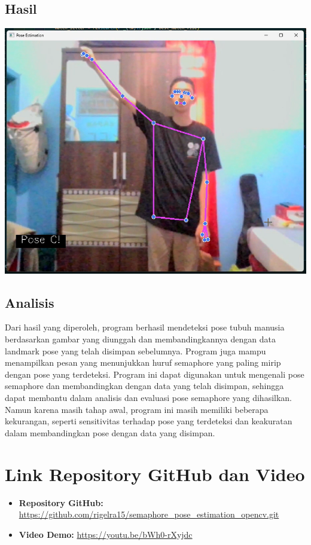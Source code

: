 \documentclass[a4paper,12pt]{article}
\begin{document}
\subsection{Hasil}
\begin{center}
    \includegraphics[width=1.0\textwidth]{results_pose.png}
\end{center}

\subsection{Analisis}
Dari hasil yang diperoleh, program berhasil mendeteksi pose tubuh manusia berdasarkan gambar yang diunggah dan membandingkannya dengan data landmark pose yang telah disimpan sebelumnya. Program juga mampu menampilkan pesan yang menunjukkan huruf semaphore yang paling mirip dengan pose yang terdeteksi. Program ini dapat digunakan untuk mengenali pose semaphore dan membandingkan dengan data yang telah disimpan, sehingga dapat membantu dalam analisis dan evaluasi pose semaphore yang dihasilkan. Namun karena masih tahap awal, program ini masih memiliki beberapa kekurangan, seperti sensitivitas terhadap pose yang terdeteksi dan keakuratan dalam membandingkan pose dengan data yang disimpan.

\section{Link Repository GitHub dan Video}
\begin{itemize}
    \item \textbf{Repository GitHub:} \url{https://github.com/rigelra15/semaphore_pose_estimation_opencv.git}
    \item \textbf{Video Demo:} \url{https://youtu.be/bWh0-rXyjdc}
\end{itemize}
\end{document}

